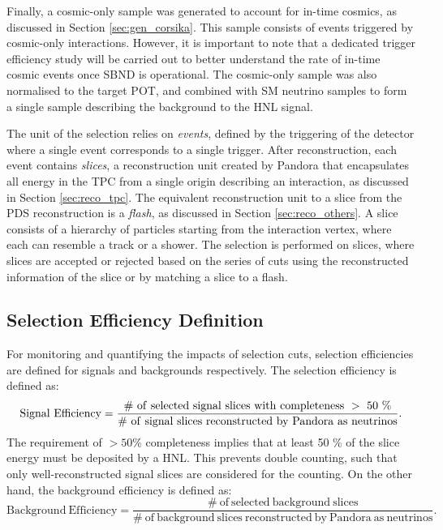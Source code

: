 Finally, a cosmic-only sample was generated to account for in-time cosmics, as discussed in Section \ref{sec:gen_corsika}.
This sample consists of events triggered by cosmic-only interactions.
However, it is important to note that a dedicated trigger efficiency study will be carried out to better understand the rate of in-time cosmic events once SBND is operational.
The cosmic-only sample was also normalised to the target POT, and combined with SM neutrino samples to form a single sample describing the background to the HNL signal.  

The unit of the selection relies on \textit{events}, defined by the triggering of the detector where a single event corresponds to a single trigger.
After reconstruction, each event contains \textit{slices}, a reconstruction unit created by Pandora that encapsulates all energy in the TPC from a single origin describing an interaction, as discussed in Section \ref{sec:reco_tpc}.        
The equivalent reconstruction unit to a slice from the PDS reconstruction is a \textit{flash}, as discussed in Section \ref{sec:reco_others}.
A slice consists of a hierarchy of particles starting from the interaction vertex, where each can resemble a track or a shower.
The selection is performed on slices, where slices are accepted or rejected based on the series of cuts using the reconstructed information of the slice or by matching a slice to a flash.


\subsection{Selection Efficiency Definition}
\label{sec:select_eff}

For monitoring and quantifying the impacts of selection cuts, selection efficiencies are defined for signals and backgrounds respectively.
The selection efficiency is defined as:
\begin{equation}
	\mathrm{Signal\ Efficiency = \frac{\#\ of\ selected\ signal\ slices\ with\ completeness\ >\ 50\ \%}{\#\ of\ signal\ slices\ reconstructed\ by\ Pandora\ as\ neutrinos}}. \\
\end{equation}
The requirement of $> 50 \%$ completeness implies that at least 50 \% of the slice energy must be deposited by a HNL.
This prevents double counting, such that only well-reconstructed signal slices are considered for the counting.                                    
On the other hand, the background efficiency is defined as:
\begin{equation}
	\mathrm{Background\ Efficiency = \frac{\#\ of\ selected\ background\ slices}{\#\ of\ background\ slices\ reconstructed\ by\ Pandora\ as\ neutrinos}}.
\end{equation}

